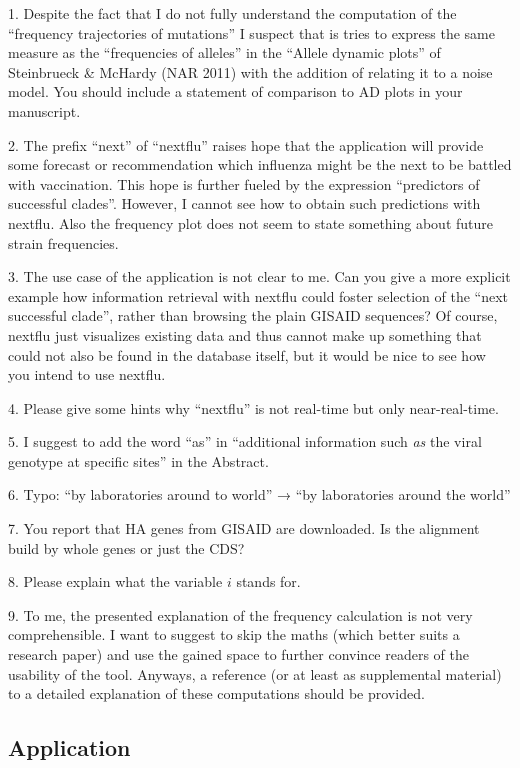\documentclass[11pt,oneside,letterpaper]{article}
\begin{document}
1. Despite the fact that I do not fully understand the computation of the ``frequency trajectories of mutations'' I suspect that is tries to express the same measure as the ``frequencies of alleles'' in the ``Allele dynamic plots'' of Steinbrueck \& McHardy (NAR 2011) with the addition of relating it to a noise model. You should include a statement of comparison to AD  plots in your manuscript.

2. The prefix ``next'' of ``nextflu'' raises hope that the application will provide some forecast or recommendation which influenza might be the next to be battled with vaccination. This hope is further fueled by the expression ``predictors of successful clades''. However, I cannot see how to obtain such predictions with nextflu. Also the frequency plot does not seem to state something about future strain frequencies.

3. The use case of the application is not clear to me. Can you give a more explicit example how information retrieval with nextflu could foster selection of the ``next successful clade'', rather than browsing the plain GISAID sequences? Of course, nextflu just visualizes existing data and thus cannot make up something that could not also be found in the database itself, but it would be nice to see how you intend to use nextflu.

4. Please give some hints why ``nextflu'' is not real-time but only near-real-time.

5. I suggest to add the word ``as'' in ``additional information such \textit{as} the viral genotype at specific sites'' in the Abstract.

6. Typo: ``by laboratories around to world'' → ``by laboratories around the world''

7. You report that HA genes from GISAID are downloaded. Is the alignment build by whole genes or just the CDS?

8. Please explain what the variable $i$ stands for.

9. To me, the presented explanation of the frequency calculation is not very comprehensible. I want to suggest to skip the maths (which better suits a research paper) and use the gained space to further convince readers of the usability of the tool. Anyways, a reference (or at least as supplemental material) to a detailed explanation of these computations should be provided.

\subsection*{Application}
\end{document}
